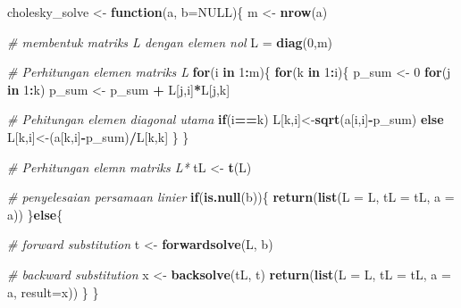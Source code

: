 \documentclass[]{book}
\newenvironment{Shaded}{\begin{snugshade}}{\end{snugshade}}
\newcommand{\CommentTok}[1]{\textcolor[rgb]{0.56,0.35,0.01}{\textit{#1}}}
\newcommand{\ControlFlowTok}[1]{\textcolor[rgb]{0.13,0.29,0.53}{\textbf{#1}}}
\newcommand{\DataTypeTok}[1]{\textcolor[rgb]{0.13,0.29,0.53}{#1}}
\newcommand{\DecValTok}[1]{\textcolor[rgb]{0.00,0.00,0.81}{#1}}
\newcommand{\KeywordTok}[1]{\textcolor[rgb]{0.13,0.29,0.53}{\textbf{#1}}}
\newcommand{\NormalTok}[1]{#1}
\newcommand{\OperatorTok}[1]{\textcolor[rgb]{0.81,0.36,0.00}{\textbf{#1}}}
\newcommand{\OtherTok}[1]{\textcolor[rgb]{0.56,0.35,0.01}{#1}}
\newcommand{\StringTok}[1]{\textcolor[rgb]{0.31,0.60,0.02}{#1}}
\theoremstyle{definition}
\theoremstyle{definition}
\theoremstyle{definition}
\theoremstyle{remark}
\begin{document}
\begin{Shaded}
\begin{Highlighting}[]
\NormalTok{cholesky_solve <-}\StringTok{ }\ControlFlowTok{function}\NormalTok{(a, }\DataTypeTok{b=}\OtherTok{NULL}\NormalTok{)\{}
\NormalTok{    m <-}\StringTok{ }\KeywordTok{nrow}\NormalTok{(a)}
   
\CommentTok{# membentuk matriks L dengan elemen nol}
\NormalTok{    L =}\StringTok{ }\KeywordTok{diag}\NormalTok{(}\DecValTok{0}\NormalTok{,m)}

\CommentTok{# Perhitungan elemen matriks L}
    \ControlFlowTok{for}\NormalTok{(i }\ControlFlowTok{in} \DecValTok{1}\OperatorTok{:}\NormalTok{m)\{}
        \ControlFlowTok{for}\NormalTok{(k }\ControlFlowTok{in} \DecValTok{1}\OperatorTok{:}\NormalTok{i)\{}
\NormalTok{            p_sum <-}\StringTok{ }\DecValTok{0}
            \ControlFlowTok{for}\NormalTok{(j }\ControlFlowTok{in} \DecValTok{1}\OperatorTok{:}\NormalTok{k)}
\NormalTok{                p_sum <-}\StringTok{ }\NormalTok{p_sum }\OperatorTok{+}\StringTok{ }\NormalTok{L[j,i]}\OperatorTok{*}\NormalTok{L[j,k]}
                
\CommentTok{# Pehitungan elemen diagonal utama}
            \ControlFlowTok{if}\NormalTok{(i}\OperatorTok{==}\NormalTok{k)}
\NormalTok{                L[k,i]<-}\KeywordTok{sqrt}\NormalTok{(a[i,i]}\OperatorTok{-}\NormalTok{p_sum)}
            \ControlFlowTok{else}
\NormalTok{                L[k,i]<-(a[k,i]}\OperatorTok{-}\NormalTok{p_sum)}\OperatorTok{/}\NormalTok{L[k,k]}
\NormalTok{        \}}
\NormalTok{    \}}
    
\CommentTok{# Perhitungan elemn matriks L*}
\NormalTok{    tL <-}\StringTok{ }\KeywordTok{t}\NormalTok{(L)}
    
\CommentTok{# penyelesaian persamaan linier}
    \ControlFlowTok{if}\NormalTok{(}\KeywordTok{is.null}\NormalTok{(b))\{}
      \KeywordTok{return}\NormalTok{(}\KeywordTok{list}\NormalTok{(}\DataTypeTok{L =}\NormalTok{ L, }\DataTypeTok{tL =}\NormalTok{ tL, }\DataTypeTok{a =}\NormalTok{ a))}
\NormalTok{    \}}\ControlFlowTok{else}\NormalTok{\{}
      
      \CommentTok{# forward substitution}
\NormalTok{      t <-}\StringTok{ }\KeywordTok{forwardsolve}\NormalTok{(L, b)}
      
      \CommentTok{# backward substitution}
\NormalTok{      x <-}\StringTok{ }\KeywordTok{backsolve}\NormalTok{(tL, t)}
      \KeywordTok{return}\NormalTok{(}\KeywordTok{list}\NormalTok{(}\DataTypeTok{L =}\NormalTok{ L, }\DataTypeTok{tL =}\NormalTok{ tL, }\DataTypeTok{a =}\NormalTok{ a, }\DataTypeTok{result=}\NormalTok{x))}
\NormalTok{     \}}
\NormalTok{\}}
\end{Highlighting}
\end{Shaded}
\end{document}
